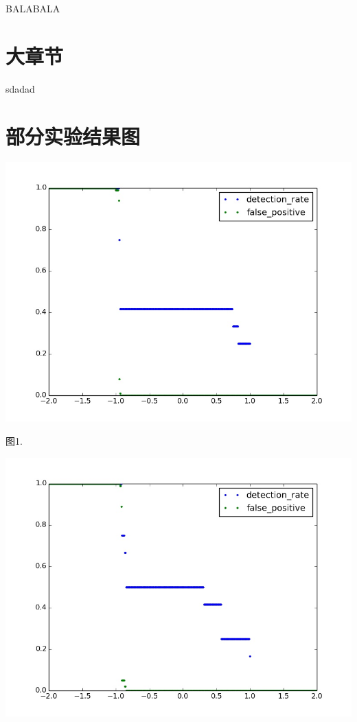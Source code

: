 \documentclass{ctexart}
\begin{document}
BALABALA

\section{大章节}

sdadad

\section{部分实验结果图}

\begin{center}

\includegraphics[height=10cm]{./graphics/AdaBoostRegressor_5E0.1L.jpg}

图1. 

\includegraphics[height=10cm]{./graphics/AdaBoostRegressor_6E0.5L.jpg}


\end{center}
\end{document}
